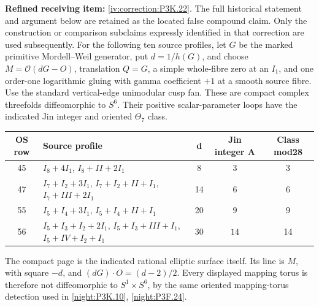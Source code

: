\begin{theorem}\hypertarget{tag-02U2}{}\label{night:P3K.22}

\par\noindent\textbf{Refined receiving item:} \cref{iv:correction:P3K.22}. The full historical statement and argument below are retained as the located false compound claim. Only the construction or comparison subclaims expressly identified in that correction are used subsequently.
For the following ten source profiles, let \(G\) be the marked
primitive Mordell--Weil generator, put \(d=1/h(G)\), and choose
\(M=\mathcal O(dG-O)\), translation \(Q=G\), a simple whole-fibre
zero at an \(I_1\), and one order-one logarithmic gluing with gamma
coefficient \(+1\) at a smooth source fibre.  Use the standard
vertical-edge unimodular cusp fan.  These are compact complex
threefolds diffeomorphic to \(S^6\).  Their positive scalar-parameter
loops have the indicated Jin integer and oriented \(\Theta_7\) class.


\begin{center}\small\begin{tabular}{c p{} c c c}\hline
OS row & Source profile & d & Jin integer A & Class mod28 \\
\hline
45 & \(I_8+4I_1\), \(I_8+II+2I_1\) & 8 & \(3\) & 3 \\
47 & \(I_7+I_2+3I_1\), \(I_7+I_2+II+I_1\), \(I_7+III+2I_1\) & 14 & \(6\) & 6 \\
55 & \(I_5+I_4+3I_1\), \(I_5+I_4+II+I_1\) & 20 & \(9\) & 9 \\
56 & \(I_5+I_3+I_2+2I_1\), \(I_5+I_3+III+I_1\), \(I_5+IV+I_2+I_1\) & 30 & \(14\) & 14 \\
\hline\end{tabular}\end{center}

The compact page is the indicated rational elliptic surface itself.
Its line is \(M\), with square \(-d\), and
\((dG)\cdot O=(d-2)/2\).  Every displayed mapping torus is therefore
not diffeomorphic to \(S^1\times S^6\), by the same oriented
mapping-torus detection used in \cref{night:P3K.10}, \cref{night:P3F.24}.


\end{theorem}
